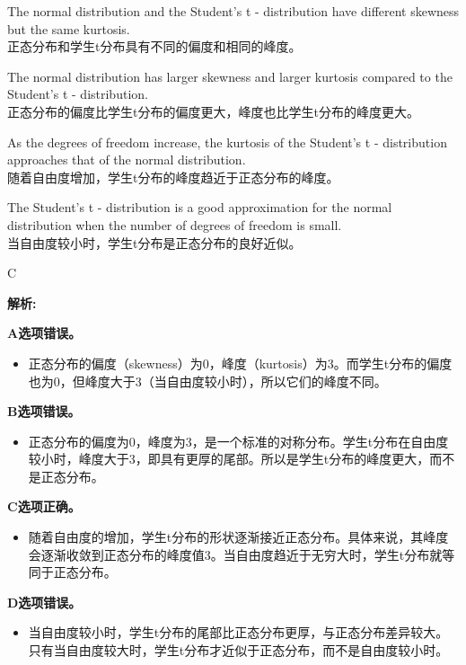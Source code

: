 \documentclass{article}
\newenvironment{explanation}
{\textbf{解析:}\par}
{\par}
\begin{document}
    \begin{choices}
        \item The normal distribution and the Student's t - distribution have different skewness but the same kurtosis.\\
        正态分布和学生t分布具有不同的偏度和相同的峰度。
        \item The normal distribution has larger skewness and larger kurtosis compared to the Student's t - distribution.\\
        正态分布的偏度比学生t分布的偏度更大，峰度也比学生t分布的峰度更大。
        \item As the degrees of freedom increase, the kurtosis of the Student's t - distribution approaches that of the normal distribution.\\
        随着自由度增加，学生t分布的峰度趋近于正态分布的峰度。
        \item The Student's t - distribution is a good approximation for the normal distribution when the number of degrees of freedom is small.\\
        当自由度较小时，学生t分布是正态分布的良好近似。
    \end{choices}
    
    \begin{correctanswer}
        C
    \end{correctanswer}
    
    \begin{explanation}
    \textbf{A选项错误。}
    \begin{itemize}
        \item 正态分布的偏度（skewness）为0，峰度（kurtosis）为3。而学生t分布的偏度也为0，但峰度大于3（当自由度较小时），所以它们的峰度不同。
    \end{itemize}
    \textbf{B选项错误。}
    \begin{itemize}
        \item 正态分布的偏度为0，峰度为3，是一个标准的对称分布。学生t分布在自由度较小时，峰度大于3，即具有更厚的尾部。所以是学生t分布的峰度更大，而不是正态分布。
    \end{itemize}
    \textbf{C选项正确。}
    \begin{itemize}
        \item 随着自由度的增加，学生t分布的形状逐渐接近正态分布。具体来说，其峰度会逐渐收敛到正态分布的峰度值3。当自由度趋近于无穷大时，学生t分布就等同于正态分布。
    \end{itemize}
    \textbf{D选项错误。}
    \begin{itemize}
        \item 当自由度较小时，学生t分布的尾部比正态分布更厚，与正态分布差异较大。只有当自由度较大时，学生t分布才近似于正态分布，而不是自由度较小时。
    \end{itemize}
    \end{explanation}
    
\end{document}
